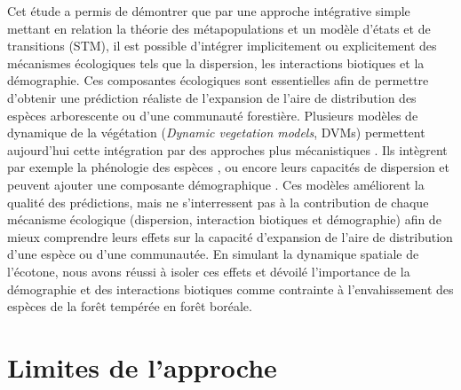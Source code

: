 
Cet étude a permis de démontrer que par une approche intégrative simple mettant en relation la
théorie des métapopulations et un modèle d'états et de transitions (STM), il est possible d'intégrer
implicitement ou explicitement des mécanismes écologiques tels que la dispersion, les interactions
biotiques et la démographie. Ces composantes écologiques sont essentielles afin de permettre
d'obtenir une prédiction réaliste de l'expansion de l'aire de distribution des espèces arborescente
ou d'une communauté forestière. Plusieurs modèles de dynamique de la végétation (\textit{Dynamic
vegetation models}, DVMs) permettent aujourd'hui cette intégration par des approches plus
mécanistiques \citep{Snell2014a}. Ils intègrent par exemple la phénologie des espèces
\citep{Letters2001,Morin2008}, ou encore leurs capacités de dispersion \citep{Nobis2014,Iverson2004}
et peuvent ajouter une composante démographique \citep{Lischke2006a,Vanderwel2014}. Ces modèles
améliorent la qualité des prédictions, mais ne s'interressent pas à la contribution de chaque
mécanisme écologique (dispersion, interaction biotiques et démographie) afin de mieux comprendre
leurs effets sur la capacité d'expansion de l'aire de distribution d'une espèce ou d'une
communautée. En simulant la dynamique spatiale de l'écotone, nous avons réussi à isoler
ces effets et dévoilé l'importance de la démographie et des interactions biotiques comme contrainte à l'envahissement des espèces de la forêt tempérée en forêt boréale.

\section*{Limites de l'approche}




